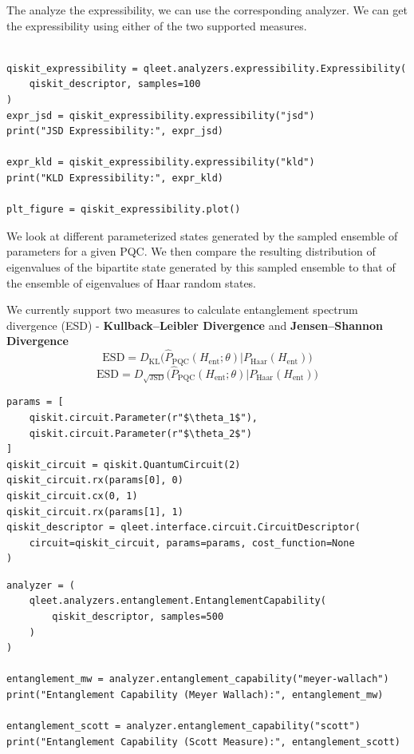 The analyze the expressibility, we can use the corresponding analyzer. We can get the expressibility using either of the two supported measures.

\begin{lstlisting}

qiskit_expressibility = qleet.analyzers.expressibility.Expressibility(
    qiskit_descriptor, samples=100
)
expr_jsd = qiskit_expressibility.expressibility("jsd")
print("JSD Expressibility:", expr_jsd)

expr_kld = qiskit_expressibility.expressibility("kld")
print("KLD Expressibility:", expr_kld)

plt_figure = qiskit_expressibility.plot()
\end{lstlisting}

We look at different parameterized states generated by the sampled ensemble of parameters for a given PQC. We then compare the resulting distribution of eigenvalues of the bipartite state generated by this sampled ensemble to that of the ensemble of eigenvalues of Haar random states.

We currently support two measures to calculate entanglement spectrum divergence (ESD) - \textbf{Kullback–Leibler Divergence} and \textbf{Jensen–Shannon Divergence}
$$\textrm{ESD} = D_{\textrm{KL}} \Big(\hat{P}_{\textrm{PQC}}(H_{\textrm{ent}}; \theta) \big\vert P_{\textrm{Haar}}(H_{\textrm{ent}}) \Big) $$
$$\textrm{ESD} = D_{\sqrt{\textrm{JSD}}} \Big(\hat{P}_{\textrm{PQC}}(H_{\textrm{ent}}; \theta) \big\vert P_{\textrm{Haar}}(H_{\textrm{ent}}) \Big) $$

\begin{lstlisting}
params = [
    qiskit.circuit.Parameter(r"$\theta_1$"),
    qiskit.circuit.Parameter(r"$\theta_2$")
]
qiskit_circuit = qiskit.QuantumCircuit(2)
qiskit_circuit.rx(params[0], 0)
qiskit_circuit.cx(0, 1)
qiskit_circuit.rx(params[1], 1)
qiskit_descriptor = qleet.interface.circuit.CircuitDescriptor(
    circuit=qiskit_circuit, params=params, cost_function=None
)
\end{lstlisting}

\begin{lstlisting}
analyzer = (
    qleet.analyzers.entanglement.EntanglementCapability(
        qiskit_descriptor, samples=500
    )
)

entanglement_mw = analyzer.entanglement_capability("meyer-wallach")
print("Entanglement Capability (Meyer Wallach):", entanglement_mw)

entanglement_scott = analyzer.entanglement_capability("scott")
print("Entanglement Capability (Scott Measure):", entanglement_scott)
\end{lstlisting}

